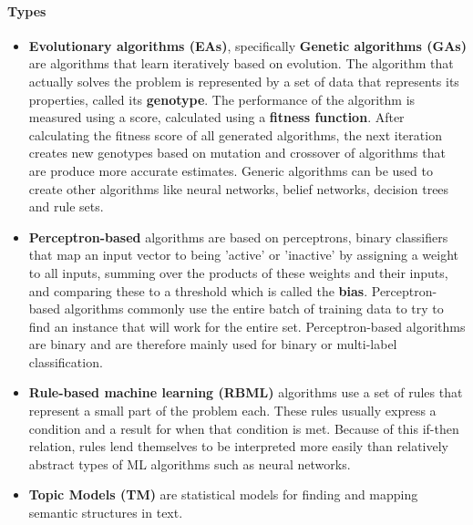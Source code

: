 \paragraph{Types}
\begin{itemize}
	\item \textbf{Evolutionary algorithms (EAs)},
		specifically \textbf{Genetic algorithms (GAs)} are algorithms that learn iteratively based on evolution. The algorithm that actually solves the problem is represented by a set of data that represents its properties, called its \textbf{genotype}. The performance of the algorithm is measured using a score, calculated using a \textbf{fitness function}. After calculating the fitness score of all generated algorithms, the next iteration creates new genotypes based on mutation and crossover of algorithms that are produce more accurate estimates. Generic algorithms can be used to create other algorithms like neural networks, belief networks, decision trees and rule sets.
	\item \textbf{Perceptron-based}
		algorithms are based on perceptrons, binary classifiers that map an input vector to being 'active' or 'inactive' by assigning a weight to all inputs, summing over the products of these weights and their inputs, and comparing these to a threshold which is called the \textbf{bias}. Perceptron-based algorithms commonly use the entire batch of training data to try to find an instance that will work for the entire set. Perceptron-based algorithms are binary and are therefore mainly used for binary or multi-label classification.
	\item \textbf{Rule-based machine learning (RBML)}
		algorithms use a set of rules that represent a small part of the problem each. These rules usually express a condition and a result for when that condition is met. Because of this if-then relation, rules lend themselves to be interpreted more easily than relatively abstract types of ML algorithms such as neural networks.
	\item \textbf{Topic Models (TM)}
		are statistical models for finding and mapping semantic structures in text.
\end{itemize}

